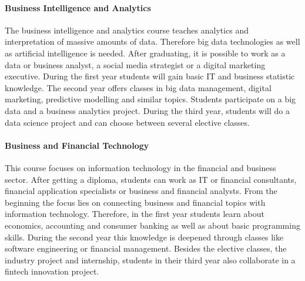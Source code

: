 \paragraph{Business Intelligence and Analytics}
The business intelligence and analytics course teaches analytics and interpretation of massive amounts of data. Therefore big data technologies as well as artificial intelligence is needed. After graduating, it is possible to work as a data or business analyst, a social media strategist or a digital marketing executive. During the first year students will gain basic IT and business statistic knowledge. The second year offers classes in big data management, digital marketing, predictive modelling and similar topics. Students participate on a big data and a business analytics project.
During the third year, students will do a data science project and can choose between several elective classes.

\paragraph{Business and Financial Technology}
This course focuses on information technology in the financial and business sector. After getting a diploma, students can work as IT or financial consultants, financial application specialists or business and financial analysts. From the beginning the focus lies on connecting business and financial topics with information technology. Therefore, in the first year students learn about economics, accounting and consumer banking as well as about basic programming skills. During the second year this knowledge is deepened through classes like software engineering or financial management. Besides the elective classes, the industry project and internship, students in their third year also collaborate in a fintech innovation project.
